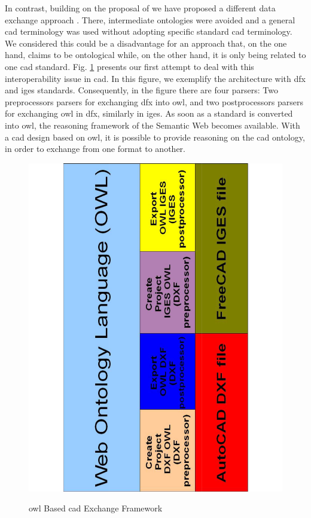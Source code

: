 In contrast, building on the proposal of \cite{abdul-ghafour_common_2007}  we  have proposed a different data exchange approach \cite{ramos_ontological_2010}. There, intermediate ontologies were avoided and a general \gls{cad} terminology was used without adopting specific standard \gls{cad} terminology. We considered this could be a disadvantage for an approach that, on the one hand, claims to be ontological while, on the other hand, it is only being related to one \gls{cad} standard. Fig. \ref{figure4-30} presents our first attempt to deal with this interoperability issue in \gls{cad}.  In this figure, we exemplify the architecture with \gls{dfx} and \gls{iges} standards. Consequently, in the figure  there are four parsers: Two preprocessors parsers for exchanging \gls{dfx} into \gls{owl}, and two postprocessors parsers for exchanging \gls{owl} in \gls{dfx}, similarly in \gls{iges}. As soon as a standard is converted into \gls{owl}, the reasoning framework of the Semantic Web becomes available. With a \gls{cad} design based on \gls{owl}, it is possible to provide reasoning on the \gls{cad} ontology, in order to exchange from one format to another. 


\begin{figure}
\begin{center}
	\includegraphics[scale=0.5, angle=270]{figure-chapterIV/fig4-30}\\
	\caption{\gls{owl} Based \gls{cad}   Exchange Framework}
	\label{figure4-30}
\end{center}
\end{figure}

